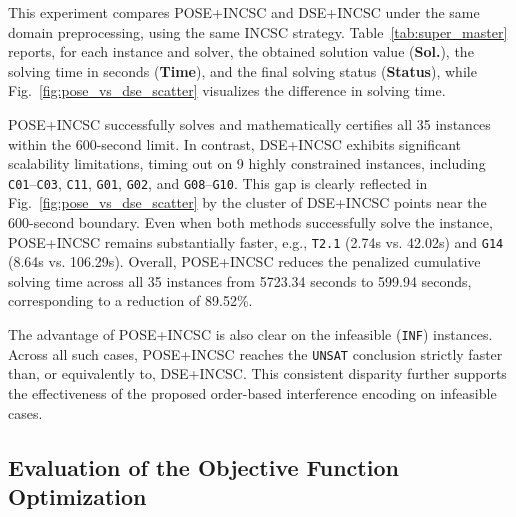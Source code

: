 \documentclass[letterpaper,journal]{IEEEtran}
\begin{document}
This experiment compares POSE+INCSC and DSE+INCSC under the same domain preprocessing, using the same INCSC strategy.
Table~\ref{tab:super_master} reports, for each instance and solver, the obtained solution value (\textbf{Sol.}), the solving time in seconds (\textbf{Time}), and the final solving status (\textbf{Status}), while Fig.~\ref{fig:pose_vs_dse_scatter} visualizes the difference in solving time.

POSE+INCSC successfully solves and mathematically certifies all 35 instances within the 600-second limit. In contrast, DSE+INCSC exhibits significant scalability limitations, timing out on 9 highly constrained instances, including \texttt{C01}--\texttt{C03}, \texttt{C11}, \texttt{G01}, \texttt{G02}, and \texttt{G08}--\texttt{G10}. This gap is clearly reflected in Fig.~\ref{fig:pose_vs_dse_scatter} by the cluster of DSE+INCSC points near the 600-second boundary. Even when both methods successfully solve the instance, POSE+INCSC remains substantially faster, e.g., \texttt{T2.1} (2.74s vs. 42.02s) and \texttt{G14} (8.64s vs. 106.29s). Overall, POSE+INCSC reduces the penalized cumulative solving time across all 35 instances from 5723.34 seconds to 599.94 seconds, corresponding to a reduction of 89.52\%.

The advantage of POSE+INCSC is also clear on the infeasible (\texttt{INF}) instances. Across all such cases, POSE+INCSC reaches the \texttt{UNSAT} conclusion strictly faster than, or equivalently to, DSE+INCSC. This consistent disparity further supports the effectiveness of the proposed order-based interference encoding on infeasible cases.


\subsection{Evaluation of the Objective Function Optimization}
\end{document}

